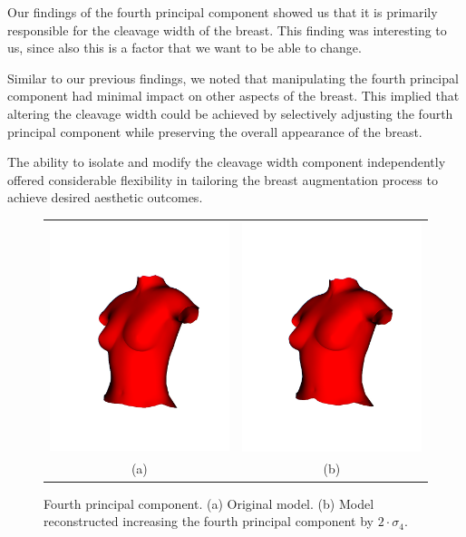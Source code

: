 Our findings of the fourth principal component showed us that it is primarily responsible for the cleavage width of the breast. This finding was interesting to us, since also this is a factor that we want
to be able to change.

Similar to our previous findings, we noted that manipulating the fourth principal component had minimal impact on other aspects of the breast. This implied that altering the cleavage width could 
be achieved by selectively adjusting the fourth principal component while preserving the overall appearance of the breast.

The ability to isolate and modify the cleavage width component independently offered considerable flexibility in tailoring the breast augmentation process to achieve desired aesthetic outcomes. 

\begin{figure}[H]
    \centering
    \begin{tabular}{@{}cc@{}}
        \includegraphics[width=0.487\linewidth]{figures/20230529-pca_base.jpg}&
        \includegraphics[width=0.487\linewidth]{figures/20230529-pca_3_comp.jpg}\\
        (a)&(b)\\
        \end{tabular}
    \caption[Fourth principal component]{Fourth principal component.
    \textup{(a)} Original model.
    \textup{(b)} Model reconstructed increasing the fourth principal component by $2 \cdot \sigma_4$.
    }

    \label{fig:pca_3}
\end{figure}


